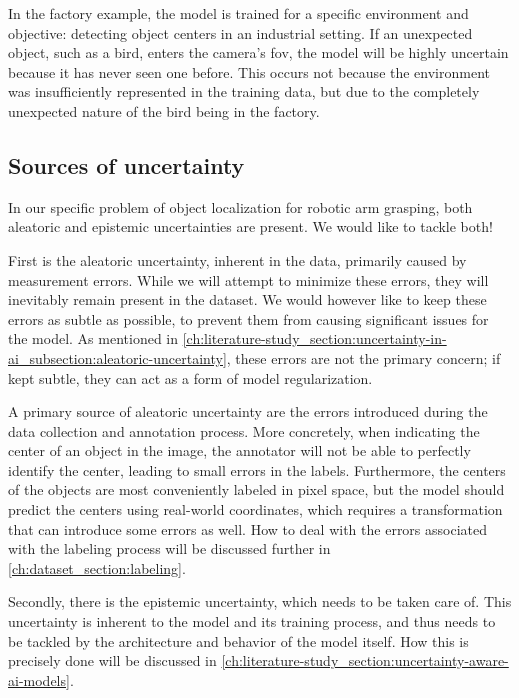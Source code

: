 In the factory example, the model is trained for a specific environment and objective: detecting object centers in an industrial setting.
If an unexpected object, such as a bird, enters the camera's \gls{fov}, the model will be highly uncertain because it has never seen one before.
This occurs not because the environment was insufficiently represented in the training data, but due to the completely unexpected nature of the bird being in the factory.

\subsection{Sources of uncertainty} \label{ch:literature-study_section:uncertainty-in-ai_subsection:sources-of-uncertainty}
In our specific problem of object localization for robotic arm grasping, both aleatoric and epistemic uncertainties are present.
We would like to tackle both!

First is the aleatoric uncertainty, inherent in the data, primarily caused by measurement errors.
While we will attempt to minimize these errors, they will inevitably remain present in the dataset.
We would however like to keep these errors as subtle as possible, to prevent them from causing significant issues for the model.
As mentioned in \cref{ch:literature-study_section:uncertainty-in-ai_subsection:aleatoric-uncertainty}, these errors are not the primary concern; if kept subtle, they can act as a form of model regularization.

A primary source of aleatoric uncertainty are the errors introduced during the data collection and annotation process.
More concretely, when indicating the center of an object in the image, the annotator will not be able to perfectly identify the center, leading to small errors in the labels.
Furthermore, the centers of the objects are most conveniently labeled in pixel space, but the model should predict the centers using real-world coordinates, which requires a transformation that can introduce some errors as well.
How to deal with the errors associated with the labeling process will be discussed further in \cref{ch:dataset_section:labeling}.

Secondly, there is the epistemic uncertainty, which needs to be taken care of.
This uncertainty is inherent to the model and its training process, and thus needs to be tackled by the architecture and behavior of the model itself.
How this is precisely done will be discussed in \cref{ch:literature-study_section:uncertainty-aware-ai-models}.

